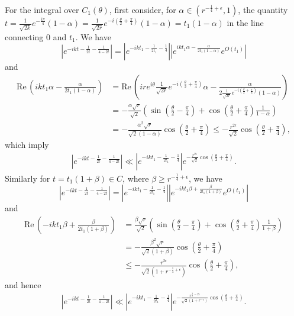 \documentclass[11pt]{amsart}
\numberwithin{theorem}{section}
\numberwithin{equation}{section}
\theoremstyle{remark}
\theoremstyle{definition}
\newcommand{\re}{\mathrm{Re}\,}
\begin{document}
For the integral over $C_1(\theta)$, first consider, for $\alpha\in (r^{-\frac{1}{4}+\epsilon},1)$, the quantity $t=\frac{1}{\sqrt{2k}}e^{-\frac{i\pi}{4}}(1-\alpha)=\frac{1}{\sqrt{2r}}e^{-i(\frac{\theta}{2}+\frac{\pi}{4})}(1-\alpha)=t_1(1- \alpha )$ in the line connecting $0$ and $t_1$. We have 
$$|e^{-ikt-\frac{1}{2t}-\frac{1}{4-2t}}|=|e^{-ikt_1-\frac{1}{2t_1}-\frac{1}{4}}||e^{ikt_1\alpha-\frac{\alpha}{2t_1(1-\alpha)}}e^{O(t_1)}|$$
and
\begin{align*}
\re \left(ikt_1\alpha-\frac{\alpha}{2t_1(1-\alpha)}\right)&=\re \left(ire^{i\theta}\frac{1}{\sqrt{2r}}e^{-i(\frac{\theta}{2}+\frac{\pi}{4})}\alpha-\frac{\alpha}{2\frac{1}{\sqrt{2r}}e^{-i(\frac{\theta}{2}+\frac{\pi}{4})}(1-\alpha)}\right)\\
& = -\frac{\alpha\sqrt{r}}{\sqrt{2}}\left(\sin\left(\frac{\theta}{2}-\frac{\pi}{4}\right)+\cos\left(\frac{\theta}{2}+\frac{\pi}{4}\right)\frac{1}{1-\alpha}\right) \\
&=-\frac{\alpha^2\sqrt{r}}{\sqrt{2}(1-\alpha)} \cos\left(\frac{\theta}{2}+\frac{\pi}{4}\right) \leq -\frac{r^{2\epsilon}}{\sqrt{2}} \cos\left(\frac{\theta}{2}+\frac{\pi}{4}\right),
\end{align*}
which imply
\begin{align*}
|e^{-ikt-\frac{1}{2t}-\frac{1}{4-2t}}|\ll|e^{-ikt_1-\frac{1}{2t_1}-\frac{1}{4}}| e^{- \frac{r^{2\epsilon}}{\sqrt{2}} \cos\left(\frac{\theta}{2}+\frac{\pi}{4}\right)}.
\end{align*}
Similarly for $t=t_1(1+\beta)\in C$, where $\beta\geq r^{ -\frac{1}{4}+\epsilon}$, we have
$$|e^{-ikt-\frac{1}{2t}-\frac{1}{4-2t}}|=|e^{-ikt_1-\frac{1}{2t_1}-\frac{1}{4}}||e^{-ikt_1\beta+\frac{\beta}{2t_1(1+\beta)}}e^{O(t_1)}|$$ and
\begin{align*}
\re \left(-ikt_1\beta+\frac{\beta}{2t_1(1+\beta)}\right)&=\frac{\beta\sqrt{r}}{\sqrt{2}}\left(\sin\left(\frac{\theta}{2}-\frac{\pi}{4}\right)+\cos\left(\frac{\theta}{2}+\frac{\pi}{4}\right)\frac{1}{1+\beta}\right)\\
&=-\frac{\beta^2\sqrt{r}}{\sqrt{2}(1+\beta)} \cos\left(\frac{\theta}{2}+\frac{\pi}{4}\right) \\ & \leq -\frac{r^{2\epsilon}}{\sqrt{2}(1+r^{-\frac{1}{4}+\epsilon})} \cos\left(\frac{\theta}{2}+\frac{\pi}{4}\right),
\end{align*}
and hence
\begin{align*}
|e^{-ikt-\frac{1}{2t}-\frac{1}{4-2t}}|\ll|e^{-ikt_1-\frac{1}{2t_1}-\frac{1}{4}}| e^{- \frac{r^{\frac{1}{2}-2\epsilon}}{\sqrt{2}(1+r^{-\epsilon})} \cos\left(\frac{\theta}{2}+\frac{\pi}{4}\right)}.
\end{align*}
\end{document}
